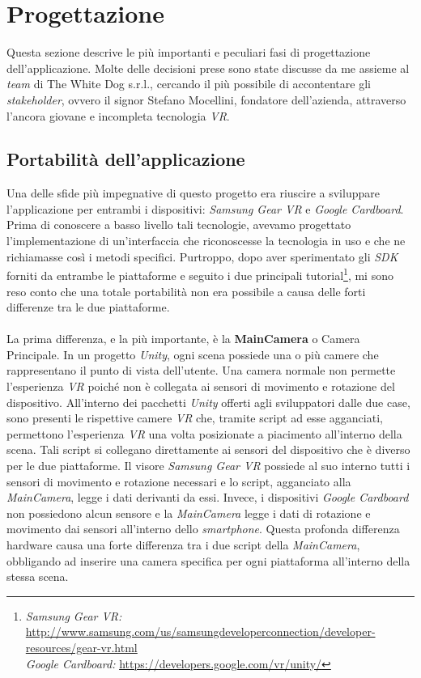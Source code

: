 \section{Progettazione}

Questa sezione descrive le più importanti e peculiari fasi di progettazione dell'applicazione. Molte delle decisioni prese sono state discusse da me assieme al \textit{team} di The White Dog s.r.l., cercando il più possibile di accontentare gli \textit{stakeholder}\hyperlink{sh}{}, ovvero il signor Stefano Mocellini, fondatore dell'azienda, attraverso l'ancora giovane e incompleta tecnologia \textit{VR}.

\subsection{Portabilità dell'applicazione}

Una delle sfide più impegnative di questo progetto era riuscire a sviluppare l'applicazione per entrambi i dispositivi: \textit{Samsung Gear VR} e \textit{Google Cardboard}. Prima di conoscere a basso livello tali tecnologie, avevamo progettato l'implementazione di un'interfaccia che riconoscesse la tecnologia in uso e che ne richiamasse così i metodi specifici. Purtroppo, dopo aver sperimentato gli \textit{SDK} forniti da entrambe le piattaforme e seguito i due principali tutorial\footnote[1]{\textit{Samsung Gear VR:} \url{http://www.samsung.com/us/samsungdeveloperconnection/developer-resources/gear-vr.html} \\ \textit{Google Cardboard:} \url{https://developers.google.com/vr/unity/}}, mi sono reso conto che una totale portabilità non era possibile a causa delle forti differenze tra le due piattaforme. \\ \\
La prima differenza, e la più importante, è la \textbf{MainCamera} o Camera Principale. In un progetto \textit{Unity}, ogni scena possiede una o più camere che rappresentano il punto di vista dell'utente. Una camera normale non permette l'esperienza \textit{VR} poiché non è collegata ai sensori di movimento e rotazione del dispositivo. All'interno dei pacchetti \textit{Unity} offerti agli sviluppatori dalle due case, sono presenti le rispettive camere \textit{VR} che, tramite script ad esse agganciati, permettono l'esperienza \textit{VR} una volta posizionate a piacimento all'interno della scena. Tali script si collegano direttamente ai sensori del dispositivo che è diverso per le due piattaforme. Il visore \textit{Samsung Gear VR} possiede al suo interno tutti i sensori di movimento e rotazione necessari e lo script, agganciato alla \textit{MainCamera}, legge i dati derivanti da essi. Invece, i dispositivi \textit{Google Cardboard} non possiedono alcun sensore e la \textit{MainCamera} legge i dati di rotazione e movimento dai sensori all'interno dello \textit{smartphone}. Questa profonda differenza hardware causa una forte differenza tra i due script della \textit{MainCamera}, obbligando ad inserire una camera specifica per ogni piattaforma all'interno della stessa scena.

